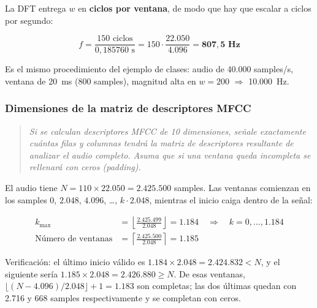 \documentclass[11pt, a4paper]{article}
\newenvironment{enunciado}
  {\begin{quote}\itshape\color{black!75}\small}
  {\end{quote}}
\begin{document}
La DFT entrega $w$ en \textbf{ciclos por ventana}, de modo que hay que escalar a ciclos por segundo:

\begin{equation}
f = \frac{150 \text{ ciclos}}{0{,}185760 \text{ s}}
= 150 \cdot \frac{22.050}{4.096} = \mathbf{807{,}5 \text{ Hz}}
\end{equation}

Es el mismo procedimiento del ejemplo de clases: audio de 40.000 samples/s, ventana de 20~ms
(800 samples), magnitud alta en $w = 200$ $\Rightarrow$ 10.000~Hz.

\subsubsection{Dimensiones de la matriz de descriptores MFCC}

\begin{enunciado}
Si se calculan descriptores MFCC de 10 dimensiones, señale exactamente cuántas filas y columnas
tendrá la matriz de descriptores resultante de analizar el audio completo. Asuma que si una ventana
queda incompleta se rellenará con ceros (padding).
\end{enunciado}

El audio tiene $N = 110 \times 22.050 = 2.425.500$ samples. Las ventanas comienzan en los
samples $0$, $2.048$, $4.096$, \dots, $k \cdot 2.048$, mientras el inicio caiga dentro de la señal:

\begin{align}
k_{\max} &= \left\lfloor \frac{2.425.499}{2.048} \right\rfloor = 1.184
\quad\Longrightarrow\quad k = 0,\dots,1.184 \\[0.3em]
\text{N\'umero de ventanas} &= \left\lceil \frac{2.425.500}{2.048} \right\rceil
= \mathbf{1.185}
\end{align}

Verificación: el último inicio válido es $1.184 \times 2.048 = 2.424.832 < N$, y el siguiente sería
$1.185 \times 2.048 = 2.426.880 \geq N$. De esas ventanas,
$\lfloor (N - 4.096)/2.048 \rfloor + 1 = 1.183$ son completas; las dos últimas quedan con 2.716 y
668 samples respectivamente y se completan con ceros.

\begin{center}
\end{center}
\end{document}
